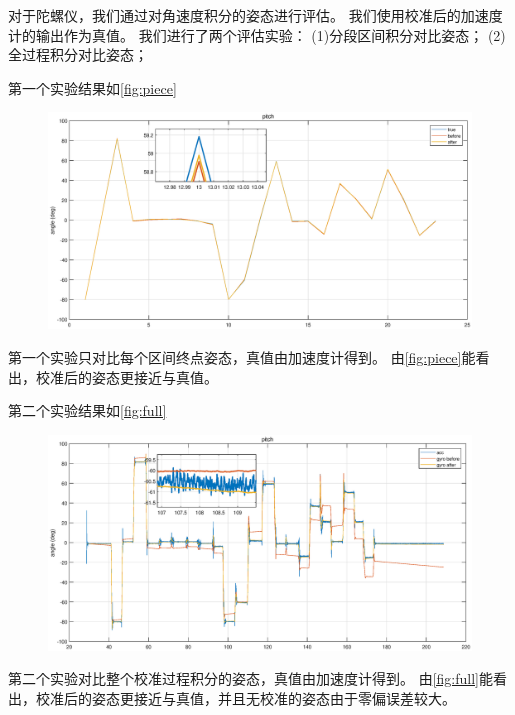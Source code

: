 \documentclass[
  type=master
]{gdutthesis}
\begin{document}
对于陀螺仪，我们通过对角速度积分的姿态进行评估。
我们使用校准后的加速度计的输出作为真值。
我们进行了两个评估实验：
(1)分段区间积分对比姿态；
(2)全过程积分对比姿态；

第一个实验结果如\autoref{fig:piece}
\begin{figure}[htbp]
	\centering
	\includegraphics[width=1.0\textwidth]{piece.eps}
	\label{fig:piece}
\end{figure}
第一个实验只对比每个区间终点姿态，真值由加速度计得到。
由\autoref{fig:piece}能看出，校准后的姿态更接近与真值。

第二个实验结果如\autoref{fig:full}
\begin{figure}[htbp]
	\centering
	\includegraphics[width=1.0\textwidth]{full.eps}
	\label{fig:full}
\end{figure}
第二个实验对比整个校准过程积分的姿态，真值由加速度计得到。
由\autoref{fig:full}能看出，校准后的姿态更接近与真值，并且无校准的姿态由于零偏误差较大。
\end{document}
